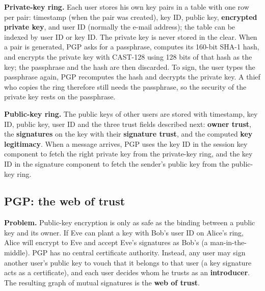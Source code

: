 \textbf{Private-key ring.} Each user stores his own key pairs in a table with one row per pair: timestamp (when the pair was created), key ID, public key, \textbf{encrypted private key}, and user ID (normally the e-mail address); the table can be indexed by user ID or key ID. The private key is never stored in the clear. When a pair is generated, PGP asks for a passphrase, computes its 160-bit SHA-1 hash, and encrypts the private key with CAST-128 using 128 bits of that hash as the key; the passphrase and the hash are then discarded. To sign, the user types the passphrase again, PGP recomputes the hash and decrypts the private key. A thief who copies the ring therefore still needs the passphrase, so the security of the private key rests on the passphrase.

\textbf{Public-key ring.} The public keys of other users are stored with timestamp, key ID, public key, user ID and the three trust fields described next: \textbf{owner trust}, the \textbf{signatures} on the key with their \textbf{signature trust}, and the computed \textbf{key legitimacy}. When a message arrives, PGP uses the key ID in the session key component to fetch the right private key from the private-key ring, and the key ID in the signature component to fetch the sender's public key from the public-key ring.

\subsection{PGP: the web of trust \new}

\textbf{Problem.} Public-key encryption is only as safe as the binding between a public key and its owner. If Eve can plant a key with Bob's user ID on Alice's ring, Alice will encrypt to Eve and accept Eve's signatures as Bob's (a man-in-the-middle). PGP has no central certificate authority. Instead, any user may sign another user's public key to vouch that it belongs to that user (a key signature acts as a certificate), and each user decides whom he trusts as an \textbf{introducer}. The resulting graph of mutual signatures is the \textbf{web of trust}.

